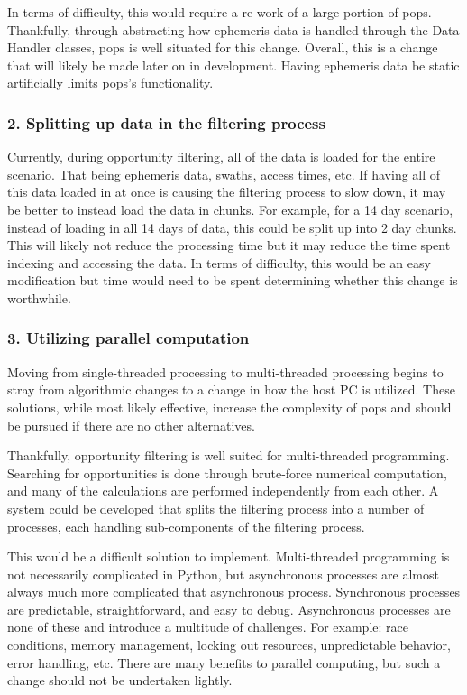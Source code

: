 In terms of difficulty, this would require a re-work of a large portion of
\gls{pops}.  Thankfully, through abstracting how ephemeris data is handled
through the Data Handler classes, \gls{pops} is well situated for this change.
Overall, this is a change that will likely be made later on in development.
Having ephemeris data be static artificially limits \gls{pops}'s functionality.


\subsubsection{2. Splitting up data in the filtering process}

Currently, during opportunity filtering, all of the data is loaded for the
entire scenario. That being ephemeris data, swaths, access times, etc. If
having all of this data loaded in at once is causing the filtering process to
slow down, it may be better to instead load the data in chunks. For example,
for a 14 day scenario, instead of loading in all 14 days of data, this could be
split up into 2 day chunks. This will likely not reduce the processing time but
it may reduce the time spent indexing and accessing the data. In terms of
difficulty, this would be an easy modification but time would need to be spent
determining whether this change is worthwhile.


\subsubsection{3. Utilizing parallel computation}

Moving from single-threaded processing to multi-threaded processing begins to
stray from algorithmic changes to a change in how the host PC is utilized.
These solutions, while most likely effective, increase the complexity of
\gls{pops} and should be pursued if there are no other alternatives.

Thankfully, opportunity filtering is well suited for multi-threaded
programming. Searching for opportunities is done through brute-force numerical
computation, and many of the calculations are performed independently from each
other. A system could be developed that splits the filtering process into a
number of processes, each handling sub-components of the filtering process. 

This would be a difficult solution to implement. Multi-threaded programming is
not necessarily complicated in Python, but asynchronous processes are almost
always much more complicated that asynchronous process. Synchronous processes
are predictable, straightforward, and easy to debug. Asynchronous processes are
none of these and introduce a multitude of challenges. For example: race
conditions, memory management, locking out resources, unpredictable behavior,
error handling, etc.  There are many benefits to parallel computing, but such a
change should not be undertaken lightly.


